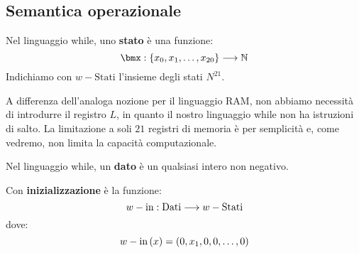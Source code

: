\documentclass{lectures}
\begin{document}
\subsection{Semantica operazionale}
\begin{multicols}{2}
    \begin{definition}
        Nel linguaggio while, uno \textbf{stato} è una funzione:
        \[
            \funcdef{\bmx}{\crl{x_0,x_1,\ldots,x_{20}}}{\N}
        \]
        Indichiamo con \(w-\text{Stati}\) l'insieme degli stati \(N^{21}\).
    \end{definition}
    \begin{observation}
        A differenza dell'analoga nozione per il linguaggio RAM, non abbiamo necessità di introdurre il registro \(L\), in quanto il nostro linguaggio while non ha istruzioni di salto. La limitazione a soli \(21\) registri di memoria è per semplicità e, come vedremo, non limita la capacità computazionale.
    \end{observation}
    \begin{definition}
        Nel linguaggio while, un \textbf{dato} è un qualsiasi intero non negativo.
    \end{definition}
    \begin{definition}
        Con \textbf{inizializzazione} è la funzione:
        \[
            w-\text{in}:\text{\text{Dati}}\longrightarrow w-\text{Stati}
        \]
        dove:
        \[
            w-\text{in}\left(x\right) = \left(0,x_1,0,0,\ldots,0\right)
        \]
    \end{definition}
\end{multicols}
\end{document}
